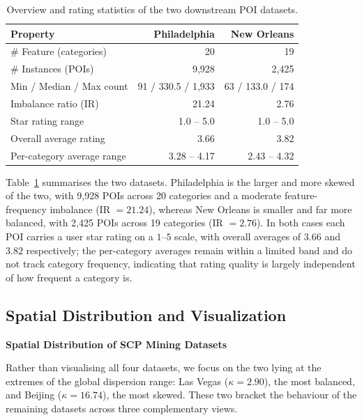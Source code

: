 \documentclass[12pt, letterpaper]{template}
\theoremstyle{definition}
\begin{document}
\begin{table}[H]
\centering
\caption{Overview and rating statistics of the two downstream POI datasets.}
\label{tab:downstream_overview}
\begin{tabular}{lrr}
\toprule
\textbf{Property} & \textbf{Philadelphia} & \textbf{New Orleans} \\
\midrule
\# Feature (categories)     & 20              & 19              \\
\# Instances (POIs)         & 9{,}928         & 2{,}425         \\
Min / Median / Max count    & 91 / 330.5 / 1{,}933 & 63 / 133.0 / 174 \\
Imbalance ratio (IR)        & 21.24           & 2.76            \\
\midrule
Star rating range           & 1.0 -- 5.0      & 1.0 -- 5.0      \\
Overall average rating      & 3.66            & 3.82            \\
Per-category average range  & 3.28 -- 4.17    & 2.43 -- 4.32    \\
\bottomrule
\end{tabular}
\end{table}

Table~\ref{tab:downstream_overview} summarises the two datasets. Philadelphia is
the larger and more skewed of the two, with 9{,}928 POIs across 20 categories and
a moderate feature-frequency imbalance (IR $= 21.24$), whereas New Orleans is
smaller and far more balanced, with 2{,}425 POIs across 19 categories (IR $=
2.76$). In both cases each POI carries a user star rating on a $1$--$5$ scale,
with overall averages of $3.66$ and $3.82$ respectively; the per-category
averages remain within a limited band and do not track category frequency,
indicating that rating quality is largely independent of how frequent a category
is.

\subsection{Spatial Distribution and Visualization} 

\vspace{4pt}
\noindent\textbf{Spatial Distribution of SCP Mining Datasets}
\vspace{2pt}

Rather than visualising all four datasets, we focus on the two lying at the
extremes of the global dispersion range: Las Vegas ($\kappa = 2.90$), the most
balanced, and Beijing ($\kappa = 16.74$), the most skewed. These two bracket the
behaviour of the remaining datasets across three complementary views.
\end{document}
